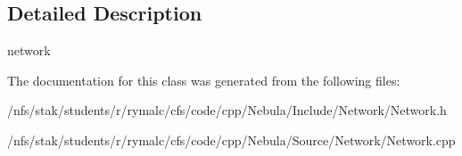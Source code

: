 \subsection{Detailed Description}
network 

The documentation for this class was generated from the following files:\begin{DoxyCompactItemize}
\item 
/nfs/stak/students/r/rymalc/cfs/code/cpp/Nebula/Include/Network/Network.h\item 
/nfs/stak/students/r/rymalc/cfs/code/cpp/Nebula/Source/Network/Network.cpp\end{DoxyCompactItemize}
